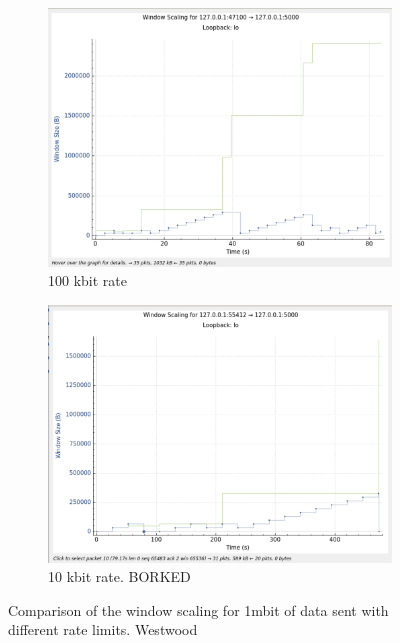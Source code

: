 \documentclass{report}
\begin{document}
\begin{figure}[H]
    \begin{subfigure}[b]{0.45\textwidth}
        \centering
        \includegraphics[width=\textwidth]{Pics/Westwood/r100kbit_s1m_ws}
        \caption{100 kbit rate}
    \end{subfigure}
    \hfill
    \begin{subfigure}[b]{0.45\textwidth}
        \centering
        \includegraphics[width=\textwidth]{Pics/Westwood/r10kbit_s1m_ws}
        \caption{10 kbit rate. BORKED}
    \end{subfigure}
    \caption{Comparison of the window scaling for 1mbit of data sent with different rate limits. Westwood}
    \label{fig:four_images}
\end{figure}
\end{document}
